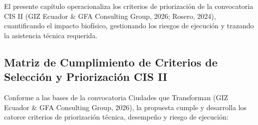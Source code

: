 \documentclass[
  spanish,
  letterpaper,
  DIV=11,
  numbers=noendperiod]{scrartcl}
\begin{document}
El presente capítulo operacionaliza los criterios de priorización de la
convocatoria CIS II (GIZ Ecuador \& GFA Consulting Group, 2026; Rosero,
2024), cuantificando el impacto biofísico, gestionando los riesgos de
ejecución y trazando la asistencia técnica requerida.

\subsection{Matriz de Cumplimiento de Criterios de Selección y
Priorización CIS
II}\label{matriz-de-cumplimiento-de-criterios-de-selecciuxf3n-y-priorizaciuxf3n-cis-ii}

Conforme a las bases de la convocatoria Ciudades que Transforman (GIZ
Ecuador \& GFA Consulting Group, 2026), la propuesta cumple y desarrolla
los catorce criterios de priorización técnica, desempeño y riesgo de
ejecución:
\end{document}
